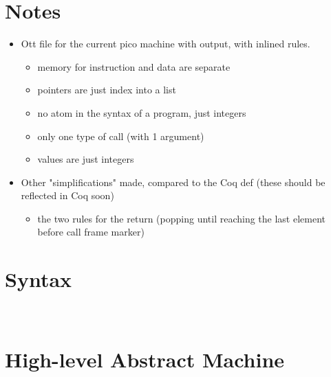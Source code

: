 \documentclass{article}
\begin{document}
\section*{Notes}

\begin{itemize}
\item Ott file for the current pico machine with output, with inlined rules.
  \begin{itemize}
  \item memory for instruction and data are separate
  \item pointers are just index into a list
  \item no atom in the syntax of a program, just integers
  \item only one type of call (with 1 argument)
  \item values are just integers
  \end{itemize}
\item Other "simplifications" made, compared to the Coq def
  (these should be reflected in Coq soon)
  \begin{itemize}
    \item the two rules for the return (popping until reaching the
      last element before call frame marker)
  \end{itemize}
\end{itemize}

\section*{Syntax}

\ottmetavars\\[3ex]

\ottgrammartabular{
\ottn\ottinterrule
\ottL\ottinterrule
\otta\ottinterrule
\ottinstr\ottinterrule
\ottS\ottinterrule
}



\newpage
\section*{High-level Abstract Machine}
\end{document}

